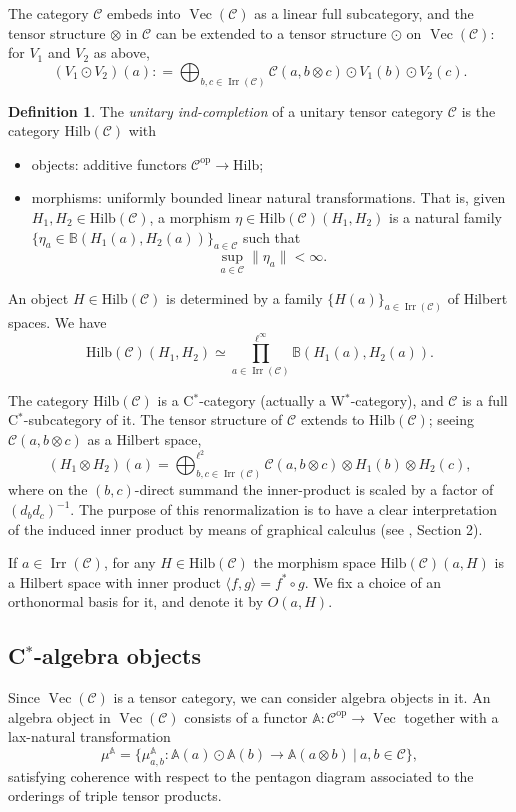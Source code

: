 \documentclass[a4paper,11pt,reqno]{amsart}
\numberwithin{equation}{section}
\theoremstyle{remark}
\theoremstyle{definition}
\newtheorem{definition}[theorem]{Definition}
\newcommand{\bA}{\mathbb A}
\newcommand{\bB}{\mathbb B}
\newcommand{\cC}{\mathcal C}
\DeclareMathOperator{\Irr}{Irr}
\DeclareMathOperator{\Vect}{Vec}
\newcommand\op{\text{op}}
\newcommand{\Hilb}{\mathrm{Hilb}}
\begin{document}
The category $\cC$ embeds into $\Vect(\cC)$ as a linear full subcategory, and the tensor structure $\otimes$ in $\cC$ can be extended to a tensor structure $\odot$ on $\Vect(\cC)$: for $V_1$ and $V_2$ as above,
\[ (V_1 \odot V_2)(a) : = \bigoplus_{b,c \in \Irr(\cC)} \cC(a, b \otimes c) \odot V_1(b) \odot V_2(c) . \]

\begin{definition}
	The {\em unitary ind-completion} of a unitary tensor category $\cC$ is the category $\Hilb(\cC)$ with
	\begin{itemize}
		\item objects: additive functors $\cC^{\op} \to \Hilb$;
		\item morphisms: uniformly bounded linear natural transformations. That is, given $H_1, H_2 \in \Hilb(\cC)$, a morphism $\eta \in \Hilb(\cC)(H_1,H_2)$ is a natural family $\{ \eta_a \in \bB(H_1(a),H_2(a))\}_{a \in \cC}$ such that
		\[ \underset{a \in \cC}{\sup} \| \eta_a \| < \infty . \]
	\end{itemize}
\end{definition}

An object $H \in \Hilb(\cC)$ is determined by a family $\{H(a)\}_{a \in \Irr(\cC)}$ of Hilbert spaces. We have
\[ \Hilb(\cC)(H_1,H_2) \simeq \prod_{a \in \Irr(\cC)}^{\ell^\infty} \bB(H_1(a),H_2(a)) . \]

The category $\Hilb(\cC)$ is a C$^*$-category (actually a W$^*$-category), and $\cC$ is a full C$^*$-subcategory of it. The tensor structure of $\cC$ extends to $\Hilb(\cC)$; seeing $\cC(a,b  \otimes c)$ as a Hilbert space,
\[ (H_1 \otimes H_2)(a) = \bigoplus_{b,c \in \Irr(\cC)}^{\ell^2} \cC(a, b \otimes c) \otimes H_1(b) \otimes H_2(c) , \]
where on the $(b,c)$-direct summand the inner-product is scaled by a factor of $(d_b d_c)^{-1}$. The purpose of this renormalization is to have a clear interpretation of the induced inner product by means of graphical calculus (see \cite{MR3687214}, Section 2).

If $a \in \Irr(\cC)$, for any $H \in \Hilb(\cC)$ the morphism space $\Hilb(\cC)(a,H)$ is a Hilbert space with inner product $\langle f, g \rangle = f^* \circ g$. We fix a choice of an orthonormal basis for it, and denote it by $O(a,H)$.

\medskip

\subsection{C$^*$-algebra objects} 
Since $\Vect(\cC)$ is a tensor category, we can consider algebra objects in it. An algebra object  in $\Vect(\cC)$ consists of a functor $\bA: \cC^{\op} \to \Vect$ together with a lax-natural transformation 
\[\mu^{\bA} = \{ \mu^{\bA}_{a,b} : \bA(a) \odot \bA(b) \to \bA(a \otimes b) \ | \ a,b \in \cC\} ,\]
satisfying coherence with respect to the pentagon diagram associated to the orderings of triple tensor products. 
\end{document}
